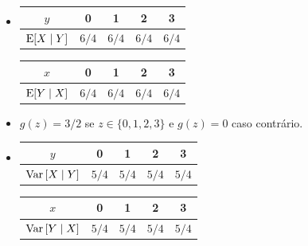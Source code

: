 \begin{respostas}
    
    \begin{itemize}
        \item [a), b)] 
        \begin{minipage}{0.48\linewidth}
            \centering
            \begin{tabular}{c cccc}
            \toprule
                $y$ & 0 & 1 & 2 & 3 \\
            \midrule
                $\mathrm{E}\!\left[X\mid Y\right]$ & $6/4$ & $6/4$ & $6/4$ & $6/4$ \\
            \bottomrule
            \end{tabular}
        \end{minipage}
        \begin{minipage}{0.48\linewidth}
            \centering
            \begin{tabular}{c cccc}
            \toprule
                $x$ & 0 & 1 & 2 & 3 \\
            \midrule
                $\mathrm{E}\!\left[Y\mid X\right]$ & $6/4$ & $6/4$ & $6/4$ & $6/4$ \\
            \bottomrule
            \end{tabular}
        \end{minipage}
        
        \item [c)]
        $g(z) = 3/2$ se $z\in\{0, 1, 2, 3\}$ e $g(z)=0$ caso contrário.
        
        \item [d), e)]
        \begin{minipage}{0.48\linewidth}
            \centering
            \begin{tabular}{c cccc}
            \toprule
                $y$ & 0 & 1 & 2 & 3 \\
            \midrule
                $\mathrm{Var}\left[X\mid Y\right]$ & $5/4$ & $5/4$ & $5/4$ & $5/4$ \\
            \bottomrule
            \end{tabular}
        \end{minipage}
        \begin{minipage}{0.48\linewidth}
            \centering
            \begin{tabular}{c cccc}
            \toprule
                $x$ & 0 & 1 & 2 & 3 \\
            \midrule
                $\mathrm{Var}\left[Y\mid X\right]$ & $5/4$ & $5/4$ & $5/4$ & $5/4$ \\
            \bottomrule
            \end{tabular}
        \end{minipage}
        

\end{itemize}
\end{respostas}
